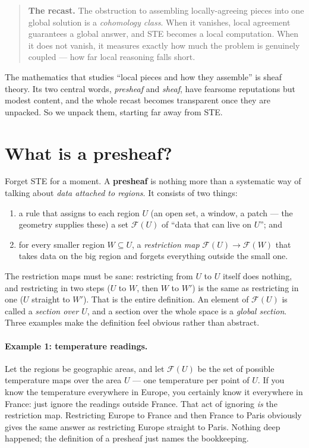 \documentclass[11pt]{article}
\begin{document}
\begin{quote}
\textbf{The recast.}  The obstruction to assembling locally-agreeing
pieces into one global solution is a \emph{cohomology class}.  When it
vanishes, local agreement guarantees a global answer, and STE becomes a
local computation.  When it does not vanish, it measures exactly how
much the problem is genuinely coupled --- how far local reasoning falls
short.
\end{quote}

The mathematics that studies ``local pieces and how they assemble'' is
sheaf theory.  Its two central words, \emph{presheaf} and \emph{sheaf},
have fearsome reputations but modest content, and the whole recast
becomes transparent once they are unpacked.  So we unpack them,
starting far away from STE.

\section{What is a presheaf?}
Forget STE for a moment.  A \textbf{presheaf} is nothing more than a
systematic way of talking about \emph{data attached to regions}.  It
consists of two things:
\begin{enumerate}
\item a rule that assigns to each region $U$ (an open set, a window, a
  patch --- the geometry supplies these) a set $\mathcal{F}(U)$ of
  ``data that can live on $U$''; and
\item for every smaller region $W \subseteq U$, a \emph{restriction
  map} $\mathcal{F}(U) \to \mathcal{F}(W)$ that takes data on the big
  region and forgets everything outside the small one.
\end{enumerate}
The restriction maps must be sane: restricting from $U$ to $U$ itself
does nothing, and restricting in two steps ($U$ to $W$, then $W$ to
$W'$) is the same as restricting in one ($U$ straight to $W'$).  That
is the entire definition.  An element of $\mathcal{F}(U)$ is called a
\emph{section over $U$}, and a section over the whole space is a
\emph{global section}.  Three examples make the definition feel
obvious rather than abstract.

\paragraph{Example 1: temperature readings.}
Let the regions be geographic areas, and let $\mathcal{F}(U)$ be the
set of possible temperature maps over the area $U$ --- one temperature
per point of $U$.  If you know the temperature everywhere in Europe,
you certainly know it everywhere in France: just ignore the readings
outside France.  That act of ignoring \emph{is} the restriction map.
Restricting Europe to France and then France to Paris obviously gives
the same answer as restricting Europe straight to Paris.  Nothing deep
happened; the definition of a presheaf just names the bookkeeping.
\end{document}
